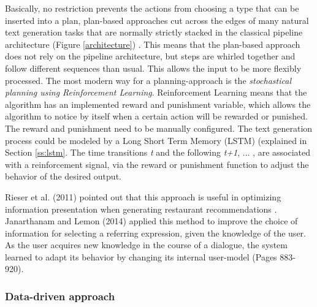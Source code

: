 Basically, no restriction prevents the actions from choosing a type that can be inserted into a plan, plan-based approaches cut across the edges of many natural text generation tasks that are normally strictly stacked in the classical pipeline architecture (Figure \ref{architecture}) \cite{gatt}. This means that the plan-based approach does not rely on the pipeline architecture, but steps are whirled together and follow different sequences than usual. This allows the input to be more flexibly processed. The most modern way for a planning-approach is the \textit{stochastical planning using Reinforcement Learning}. Reinforcement Learning means that the algorithm has an implemented reward and punishment variable, which allows the algorithm to notice by itself when a certain action will be rewarded or punished. The reward and punishment need to be manually configured. The text generation process could be modeled by a Long Short Term Memory (LSTM) (explained in Section \ref{ss:lstm}. The time transitions \textit{t} and the following \textit{t+1}, ... , are associated with a reinforcement signal, via the reward or punishment function to adjust the behavior of the desired output. 

Rieser et al. (2011) pointed out that this approach is useful in optimizing information presentation when generating restaurant recommendations \cite{rieser}. Janarthanam and Lemon (2014) applied this method to improve the choice of information for selecting a referring expression, given the knowledge of the user.  As the user acquires new knowledge in the course of a dialogue, the system learned to adapt its behavior by changing its internal user-model \cite{janarthanam-lemon-2014-adaptive} (Pages 883-920).

\subsubsection{Data-driven approach}\label{ss:data}


